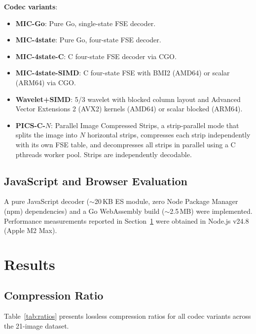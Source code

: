 \documentclass[journal]{IEEEtran}
\begin{document}
\textbf{Codec variants}:
\begin{itemize}
  \item \textbf{MIC-Go}: Pure Go, single-state FSE decoder.
  \item \textbf{MIC-4state}: Pure Go, four-state FSE decoder.
  \item \textbf{MIC-4state-C}: C four-state FSE decoder via CGO.
  \item \textbf{MIC-4state-SIMD}: C four-state FSE with BMI2 (AMD64) or scalar
  (ARM64) via CGO.
  \item \textbf{Wavelet+SIMD}: 5/3 wavelet with blocked column layout and
  Advanced Vector Extensions 2 (AVX2) kernels (AMD64) or scalar blocked
  (ARM64).
  \item \textbf{PICS-C-$N$}: Parallel Image Compressed Strips, a strip-parallel
  mode that splits the image into $N$ horizontal strips, compresses each
  strip independently with its own FSE table, and decompresses all strips
  in parallel using a C pthreads worker pool. Strips are independently
  decodable.
\end{itemize}


\subsection{JavaScript and Browser Evaluation}

A pure JavaScript decoder (${\sim}$20\,KB ES module, zero Node Package Manager
(npm) dependencies) and a Go WebAssembly build (${\sim}$2.5\,MB) were
implemented. Performance measurements reported in Section~\ref{sec:results}
were obtained in Node.js v24.8 (Apple M2 Max).

\section{Results}
\label{sec:results}

\subsection{Compression Ratio}

Table~\ref{tab:ratios} presents lossless compression ratios for all codec
variants across the 21-image dataset.
\end{document}
